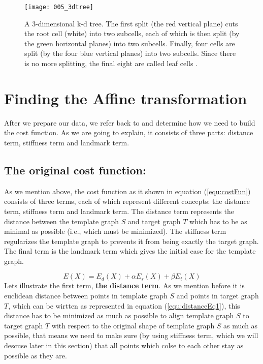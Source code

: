 \documentclass[../structure.tex]{subfiles}
\begin{document}
\begin{figure}[h!]
\centering
\texttt{[image: 005\_3dtree]}
\captionsetup{justification=centering}
\caption{A 3-dimensional k-d tree. The first split (the red vertical plane) cuts the root cell (white) into two subcells, each of which is then split (by the green horizontal planes) into two subcells. Finally, four cells are split (by the four blue vertical planes) into two subcells. Since there is no more splitting, the final eight are called leaf cells \cite{Wikipedia2006}.}
\label{fig:data}
\end{figure}

\section{Finding the Affine transformation}
After we prepare our data, we refer back to \cite{Amberg2007} and determine how we need to build the cost function. As we are going to explain, it consists of three parts: distance term, stiffness term and landmark term.
\subsection{The original cost function:}
As we mention above, the cost function as it shown in equation (\ref{equ:costFun}) consists of three terms, each of which represent different concepts: the distance term, stiffness term and landmark term. The distance term represents the distance between the template graph $S$ and target graph $T$ which has to be as minimal as possible (i.e., which must be minimized). The stiffness term regularizes the template graph to prevents it from being exactly the target graph. The final term is the landmark term which gives the initial case for the template graph.

\begin{equation}
E(X) = E_{d}(X) + \alpha E_{s}(X) + \beta E_{t}(X)
\label{equ:costFun}
\end{equation}
Lets illustrate the first term, \textbf{the distance term}. As we mention before it is euclidean distance between points in template graph $S$ and points in target graph $T$, which can be wirtten as represented in equation (\ref{equ:distanceEq1}), this distance has to be minimized as much as possible to align template graph $S$ to target graph $T$ with respect to the original shape of template graph $S$ as much as possible, that means we need to make sure (by using stiffness term, which we will descuse later in this section) that all points which colse to each other stay as possible as they are.
\end{document}
